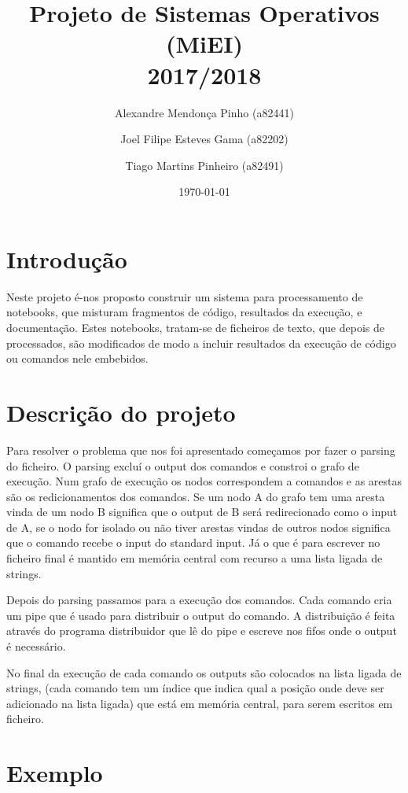 \documentclass[12pt]{report}
\title{Projeto de Sistemas Operativos (MiEI) \\ 2017/2018}
\author{Alexandre Mendonça Pinho (a82441) \and Joel Filipe Esteves Gama (a82202) \and Tiago Martins Pinheiro (a82491)}
\date{\today}
\newcommand\tab[1][0.5cm]{\hspace*{#1}}
\begin{document}
\maketitle

\tableofcontents

\chapter{Introdução}
\label{sec:introducao}

\tab Neste projeto é-nos proposto construir um sistema para processamento de notebooks, que misturam fragmentos de código, resultados da execução, e documentação. Estes notebooks, tratam-se de ficheiros de texto, que depois de processados, são modificados de modo a incluir resultados da execução de código ou comandos nele embebidos.

\chapter{Descrição do projeto}
\label{sec:descricao}

\tab Para resolver o problema que nos foi apresentado começamos por fazer o parsing do ficheiro. O parsing excluí o output dos comandos e constroi o grafo de execução. Num grafo de execução os nodos correspondem a comandos e as arestas são os redicionamentos dos comandos. Se um nodo A do grafo tem uma aresta vinda de um nodo B significa que o output de B será redirecionado como o input de A, se o nodo for isolado ou não tiver arestas vindas de outros nodos significa que o comando recebe o input do standard input. Já o que é para escrever no ficheiro final é mantido em memória central com recurso a uma lista ligada de strings.

Depois do parsing passamos para a execução dos comandos. Cada comando cria um pipe que é usado para distribuir o output do comando. A distribuição é feita através do programa distribuidor que lê do pipe e escreve nos fifos onde o output é necessário.

No final da execução de cada comando os outputs são colocados na lista ligada de strings, (cada comando tem um índice que indica qual a posição onde deve ser adicionado na lista ligada) que está em memória central, para serem escritos em ficheiro.
\chapter{Exemplo}

\label{sec:exemplo}
\end{document}
